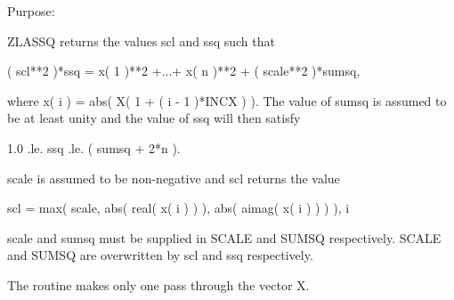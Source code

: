  \begin{DoxyParagraph}{Purpose\+: }
\begin{DoxyVerb} ZLASSQ returns the values scl and ssq such that

    ( scl**2 )*ssq = x( 1 )**2 +...+ x( n )**2 + ( scale**2 )*sumsq,

 where x( i ) = abs( X( 1 + ( i - 1 )*INCX ) ). The value of sumsq is
 assumed to be at least unity and the value of ssq will then satisfy

    1.0 .le. ssq .le. ( sumsq + 2*n ).

 scale is assumed to be non-negative and scl returns the value

    scl = max( scale, abs( real( x( i ) ) ), abs( aimag( x( i ) ) ) ),
           i

 scale and sumsq must be supplied in SCALE and SUMSQ respectively.
 SCALE and SUMSQ are overwritten by scl and ssq respectively.

 The routine makes only one pass through the vector X.\end{DoxyVerb}
 
\end{DoxyParagraph}

